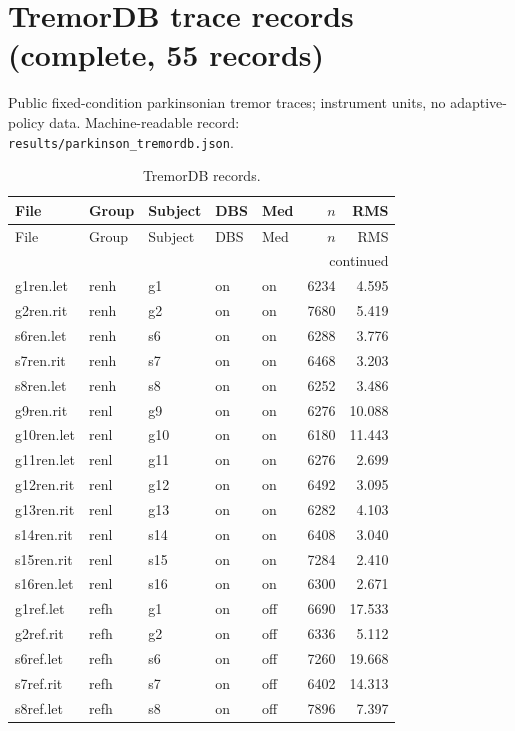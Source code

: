 \section{TremorDB trace records (complete, 55 records)}
Public fixed-condition parkinsonian tremor traces; instrument units, no adaptive-policy data. Machine-readable record:\\ \texttt{results/parkinson\_tremordb.json}.
\begin{footnotesize}\begin{longtable}{lllllrr}
\caption{TremorDB records.}\\ \toprule
File & Group & Subject & DBS & Med & $n$ & RMS \\ \midrule \endfirsthead
\toprule File & Group & Subject & DBS & Med & $n$ & RMS \\ \midrule \endhead
\midrule \multicolumn{7}{r}{continued}\\ \endfoot \bottomrule \endlastfoot
g1ren.let & renh & g1 & on & on & 6234 & 4.595 \\
g2ren.rit & renh & g2 & on & on & 7680 & 5.419 \\
s6ren.let & renh & s6 & on & on & 6288 & 3.776 \\
s7ren.rit & renh & s7 & on & on & 6468 & 3.203 \\
s8ren.let & renh & s8 & on & on & 6252 & 3.486 \\
g9ren.rit & renl & g9 & on & on & 6276 & 10.088 \\
g10ren.let & renl & g10 & on & on & 6180 & 11.443 \\
g11ren.let & renl & g11 & on & on & 6276 & 2.699 \\
g12ren.rit & renl & g12 & on & on & 6492 & 3.095 \\
g13ren.rit & renl & g13 & on & on & 6282 & 4.103 \\
s14ren.rit & renl & s14 & on & on & 6408 & 3.040 \\
s15ren.rit & renl & s15 & on & on & 7284 & 2.410 \\
s16ren.let & renl & s16 & on & on & 6300 & 2.671 \\
g1ref.let & refh & g1 & on & off & 6690 & 17.533 \\
g2ref.rit & refh & g2 & on & off & 6336 & 5.112 \\
s6ref.let & refh & s6 & on & off & 7260 & 19.668 \\
s7ref.rit & refh & s7 & on & off & 6402 & 14.313 \\
s8ref.let & refh & s8 & on & off & 7896 & 7.397 \\

\end{longtable}
\end{footnotesize}
